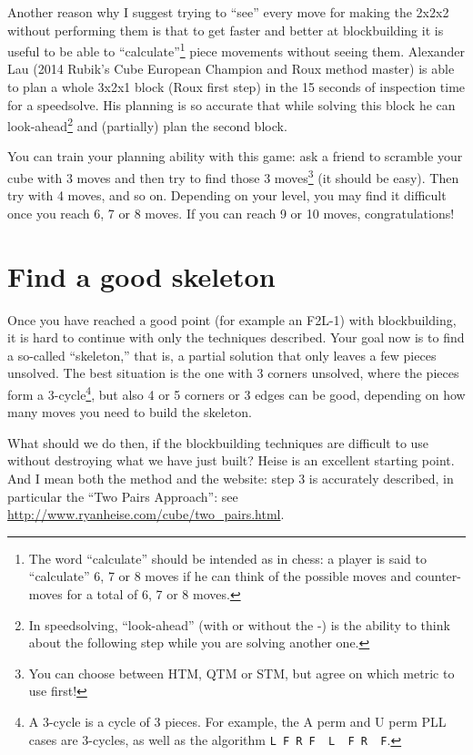 \documentclass[11pt,a4paper]{book}
\newcommand{\p}{\textquotesingle}
\newcommand{\m}{\texttt}
\newcommand{\ps}{\p\,\,}
\begin{document}
Another reason why I suggest trying to ``see'' every move for making the 2x2x2 without performing them is that to get faster and better at blockbuilding it is useful to be able to ``calculate''\footnote{The word ``calculate'' should be intended as in chess: a player is said to ``calculate'' 6, 7 or 8 moves if he can think of the possible moves and counter-moves for a total of 6, 7 or 8 moves.} piece movements without seeing them. Alexander Lau (2014 Rubik's Cube European Champion and Roux method master) is able to plan a whole 3x2x1 block (Roux first step) in the 15 seconds of inspection time for a speedsolve. His planning is so accurate that while solving this block he can look-ahead\footnote{In speedsolving, ``look-ahead'' (with or without the -) is the ability to think about the following step while you are solving another one.} and (partially) plan the second block.

You can train your planning ability with this game: ask a friend to scramble your cube with 3 moves and then try to find those 3 moves\footnote{You can choose between HTM, QTM or STM, but agree on which metric to use first!} (it should be easy). Then try with 4 moves, and so on. Depending on your level, you may find it difficult once you reach 6, 7 or 8 moves. If you can reach 9 or 10 moves, congratulations!

\section{Find a good skeleton}

Once you have reached a good point (for example an F2L-1) with blockbuilding, it is hard to continue with only the techniques described. Your goal now is to find a so-called ``skeleton,'' that is, a partial solution that only leaves a few pieces unsolved. The best situation is the one with 3 corners unsolved, where the pieces form a 3-cycle\footnote{A 3-cycle is a cycle of 3 pieces. For example, the A perm and U perm PLL cases are 3-cycles, as well as the algorithm \m{L F R F\ps L\ps F R\ps F\p}.}, but also 4 or 5 corners or 3 edges can be good, depending on how many moves you need to build the skeleton.

What should we do then, if the blockbuilding techniques are difficult to use without destroying what we have just built? Heise is an excellent starting point. And I mean both the method and the website: step 3 is accurately described, in particular the ``Two Pairs Approach'': see \url{http://www.ryanheise.com/cube/two_pairs.html}.
\end{document}
